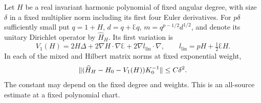 \begin{lemma}
\label{inf:quadratic-graph}
Let $H$ be a real invariant harmonic polynomial of fixed angular degree,
with size $\delta$ in a fixed multiplier norm including its first
four Euler derivatives. For $p\delta$ sufficiently small put
$q=1+H$, $d=q+\Euler q$, $m=q^{p-1/2}d^{1/2}$, and denote its
unitary Dirichlet operator by $\widehat H_H$. Its first variation is
\[
 V_1(H)=2H\Delta+2\nabla H\cdot\nabla\Euler
                         +2\nabla l_{\mathrm{lin}}\cdot\nabla,
 \qquad l_{\mathrm{lin}}=pH+\tfrac12\Euler H.
\]
In each of the mixed and Hilbert matrix norms at fixed exponential
weight,
\begin{equation}\label{inf:quadratic-graph-bound}
 \lVert (\widehat H_H-H_0-V_1(H))K_0^{-1}\rVert\le C\delta^2.
\end{equation}
The constant may depend on the fixed degree and weights. This is
an all-source estimate at a fixed polynomial chart.
\end{lemma}
